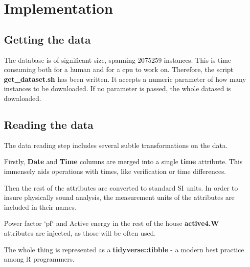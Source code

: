 \documentclass[11pt]{article}
\newcommand{\code}[1]{\textbf{#1}}
\newcommand{\para}[0]{\par\vspace{0.5cm}}
\begin{document}
\section{Implementation}
\subsection{Getting the data}
The database is of significant size, spanning 2075259 instances.
This is time consuming both for a human and for a cpu to work on.
Therefore, the script \code{get\_dataset.sh} has been written.
It accepts a numeric parameter of how many instances to be downloaded.
If no parameter is passed, the whole datased is downloaded.

\subsection{Reading the data}
The data reading step includes several subtle transformations on the data.
\para
Firstly, \code{Date} and \code{Time} columns are merged into a single \code{time} attribute.
This immensely aids operations with times, like verification or time differences.
\para
Then the rest of the attributes are converted to standard SI units.
In order to insure physically sound analysis, the measurement units of the attributes are included in their names.
\para
Power factor `pf` and Active energy in the rest of the house \code{active4.W} attributes are injected, as those will be often used.
\para
The whole thing is represented as a \code{tidyverse::tibble} - a modern best practice among R programmers. 
\end{document}
